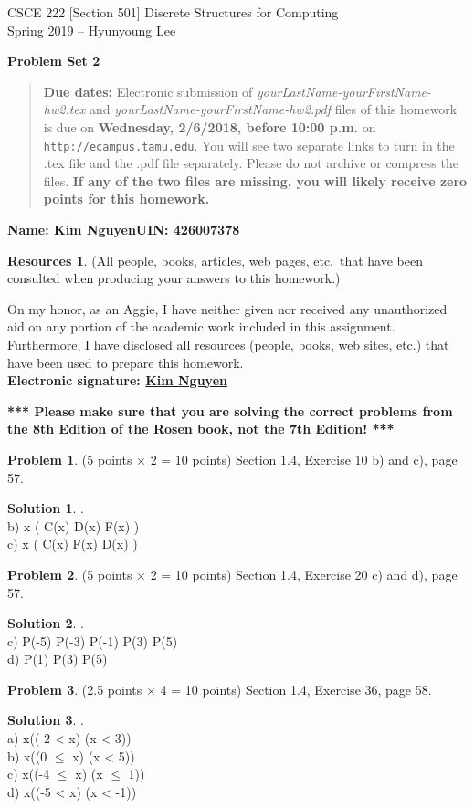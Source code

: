 \documentclass{article}
\theoremstyle{definition}
\newtheorem{problem}{Problem}
\newtheorem*{solution}{Solution}
\newtheorem*{resources}{Resources}
\newcommand{\name}[2]{\noindent\textbf{Name: #1}\hfill \textbf{UIN: #2}}
\newcommand{\honor}{\noindent On my honor, as an Aggie, I have neither
  given nor received any unauthorized aid on any portion of the
  academic work included in this assignment. Furthermore, I have
  disclosed all resources (people, books, web sites, etc.) that have
  been used to prepare this homework. \\[2ex]
 \textbf{Electronic signature: \underline{ Kim Nguyen } }}
\newcommand{\problemset}[1]{\begin{center}\textbf{Problem Set #1}\end{center}}
\newcommand{\duedate}[1]{\begin{quote}\textbf{Due dates:} Electronic
    submission of \textsl{yourLastName-yourFirstName-hw2.tex} and 
    \textsl{yourLastName-yourFirstName-hw2.pdf} files of this homework is due on
    \textbf{#1} on \texttt{http://ecampus.tamu.edu}. You will see two separate links
    to turn in the .tex file and the .pdf file separately. Please do not archive or compress the files.
    \textbf{If any of the two files are missing, you will likely receive zero points for this 
    homework.}\end{quote} }
\begin{document}
\vspace*{-15mm}
\begin{center}
{\large
CSCE 222 [Section 501] Discrete Structures for Computing\\[.5ex]
Spring 2019 -- Hyunyoung Lee\\}
\end{center}
\problemset{2}
\duedate{Wednesday, 2/6/2018, before 10:00 p.m.}
\name{Kim Nguyen}{426007378}
\begin{resources} (All people, books, articles, web pages, etc.\ that
  have been consulted when producing your answers to this homework.)
\end{resources}
\honor

\bigskip

\noindent
\textbf{*** Please make sure that you are solving the correct problems from 
the \underline{8th Edition of the Rosen book}, not the 7th Edition! ***}

\medskip


\begin{problem} (5 points $\times$ 2 = 10 points) Section 1.4, Exercise 10 b) and c), page 57. 
\end{problem}
\begin{solution} .\\
b) \forall x ( C(x) \land D(x) \land F(x) ) \\
c) \exists x ( C(x) \land F(x) \land \neg D(x) )
\end{solution}

\begin{problem} (5 points $\times$ 2 = 10 points) Section 1.4, Exercise 20 c) and d), page 57.
\end{problem}
\begin{solution}.\\
c) P(-5) \land P(-3) \land P(-1) \land P(3) \land P(5)\\
d) P(1) \lor P(3) \lor P(5) 
\end{solution}

\begin{problem} (2.5 points $\times$ 4 = 10 points) Section 1.4, Exercise 36, page 58.
\end{problem}
\begin{solution}.\\
a) \forall x((-2 < x) \land (x < 3))\\
b) \forall x((0 $\leq$ x) \land (x < 5))\\
c) \exists x((-4 $\leq$ x) \land (x $\leq$ 1))\\
d) \exists x((-5 < x) \land (x < -1))\\
\end{solution}
\end{document}

